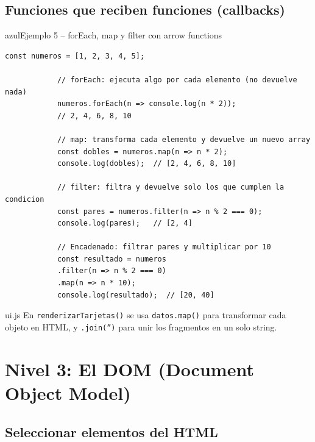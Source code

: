 \documentclass[11pt,a4paper]{article}
\begin{document}
	\subsection{Funciones que reciben funciones (callbacks)}
	
	\begin{cajacodigo}{azul}{Ejemplo 5 -- forEach, map y filter con arrow functions}
		\begin{lstlisting}[style=codejs]
			const numeros = [1, 2, 3, 4, 5];
			
			// forEach: ejecuta algo por cada elemento (no devuelve nada)
			numeros.forEach(n => console.log(n * 2));
			// 2, 4, 6, 8, 10
			
			// map: transforma cada elemento y devuelve un nuevo array
			const dobles = numeros.map(n => n * 2);
			console.log(dobles);  // [2, 4, 6, 8, 10]
			
			// filter: filtra y devuelve solo los que cumplen la condicion
			const pares = numeros.filter(n => n % 2 === 0);
			console.log(pares);   // [2, 4]
			
			// Encadenado: filtrar pares y multiplicar por 10
			const resultado = numeros
			.filter(n => n % 2 === 0)
			.map(n => n * 10);
			console.log(resultado);  // [20, 40]
		\end{lstlisting}
	\end{cajacodigo}
	
	\begin{cajapractica}{ui.js}
		En \texttt{renderizarTarjetas()} se usa \texttt{datos.map()} para transformar cada objeto en HTML, y \texttt{.join('')} para unir los fragmentos en un solo string.
	\end{cajapractica}
	
	\section{Nivel 3: El DOM (Document Object Model)}
	
	\subsection{Seleccionar elementos del HTML}
	
\end{document}
